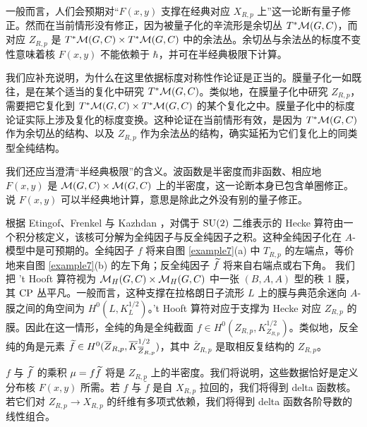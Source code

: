 一般而言，人们会预期对“$F(x,y)$ 支撑在经典对应 $X_{R,p}$ 上”这一论断有量子修正。然而在当前情形没有修正，因为被量子化的辛流形是余切丛 $T^*{\mathcal M}(G,C)$，而对应 $Z_{R,p}$ 是 $T^*{\mathcal M}(G,C)\times T^*{\mathcal M}(G,C)$ 中的余法丛。余切丛与余法丛的标度不变性意味着核 $F(x,y)$ 不能依赖于 $\hbar$，并可在半经典极限下计算。

我们应补充说明，为什么在这里依据标度对称性作论证是正当的。膜量子化一如既往，是在某个适当的复化中研究 $T^*{\mathcal M}(G,C)$。类似地，在膜量子化中研究 $Z_{R,p}$，需要把它复化到 $T^*{\mathcal M}(G,C)\times T^*{\mathcal M}(G,C)$ 的某个复化之中。膜量子化中的标度论证实际上涉及复化的标度变换。这种论证在当前情形有效，是因为 $T^*{\mathcal M}(G,C)$ 作为余切丛的结构、以及 $Z_{R,p}$ 作为余法丛的结构，确实延拓为它们复化上的同类型全纯结构。

我们还应当澄清“半经典极限”的含义。波函数是半密度而非函数、相应地 $F(x,y)$ 是 ${\mathcal M}(G,C) \times {\mathcal M}(G,C)$ 上的半密度，这一论断本身已包含单圈修正。说 $F(x,y)$ 可以半经典地计算，意思是除此之外没有别的量子修正。

根据 Etingof、Frenkel 与 Kazhdan \cite{EFK2}，对偶于 ${\mathrm{SU}}(2)$ 二维表示的 Hecke 算符由一个积分核定义，该核可分解为全纯因子与反全纯因子之积。这种全纯因子化在 $A$-模型中是可预期的。全纯因子 $f$ 将来自图 \ref{example7}(a) 中 $T_{R,p}$ 的左端点，等价地来自图 \ref{example7}(b) 的左下角；反全纯因子 $\widetilde f$ 将来自右端点或右下角。
我们把 't Hooft 算符视为 ${\mathcal M}_H(G,C)\times {\mathcal M}_H(G,C)$ 中一张 $(B,A,A)$ 型的秩 1 膜，其 ${\mathrm{CP}}$ 丛平凡。一般而言，这种支撑在拉格朗日子流形 $L$ 上的膜与典范余迷向 $A$-膜之间的角空间为 $H^0(L,K_L^{1/2})$。't Hooft 算符对应于支撑为 Hecke 对应 $Z_{R,p}$ 的膜。因此在这一情形，全纯的角是全纯截面 $f\in H^0(Z_{R,p},K^{1/2}_{Z_{R,p}})$。类似地，反全纯的角是元素 $\widetilde f\in H^0(\overline Z_{R,p},\overline K^{1/2}_{\overline Z_{R,p}})$，其中 $\bar Z_{R,p}$ 是取相反复结构的 $Z_{R,p}$。
 
 
  
$f$ 与 $\widetilde f$ 的乘积 $\mu = f \widetilde f$ 将是 $Z_{R,p}$ 上的半密度。我们将说明，这些数据恰好是定义分布核 $F(x,y)$ 所需。若 $f$ 与 $\tilde f$ 是自 $X_{R,p}$ 拉回的，我们将得到 delta 函数核。若它们对 $Z_{R,p} \to X_{R,p}$ 的纤维有多项式依赖，我们将得到 delta 函数各阶导数的线性组合。

